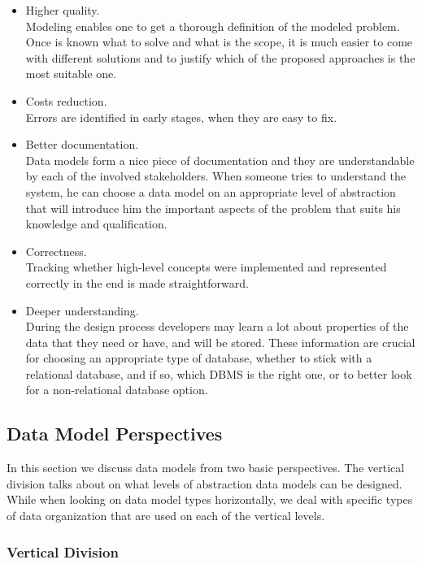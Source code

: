 \begin{itemize}
	\item Higher quality.\\ Modeling enables one to get a thorough definition of the modeled problem. Once is known what to solve and what is the scope, it is much easier to come with different solutions and to justify which of the proposed approaches is the most suitable one.
	
	\item Costs reduction.\\ Errors are identified in early stages, when they are easy to fix.
	
	\item Better documentation.\\ Data models form a nice piece of documentation and they are understandable by each of the involved stakeholders. When someone tries to understand the system, he can choose a data model on an appropriate level of abstraction that will introduce him the important aspects of the problem that suits his knowledge and qualification.
	
	\item Correctness.\\ Tracking whether high-level concepts were implemented and represented correctly in the end is made straightforward.
	
	\item Deeper understanding.\\ During the design process developers may learn a lot about properties of the data that they need or have, and will be stored. These information are crucial for choosing an appropriate type of database, whether to stick with a relational database, and if so, which DBMS is the right one, or to better look for a non-relational database option.
\end{itemize}

\subsection{Data Model Perspectives}

In this section we discuss data models from two basic perspectives. 
The vertical division talks about on what levels of abstraction data models can be designed. 
While when looking on data model types horizontally, we deal with specific types of data organization that are used on each of the vertical levels.

\subsubsection{Vertical Division}

